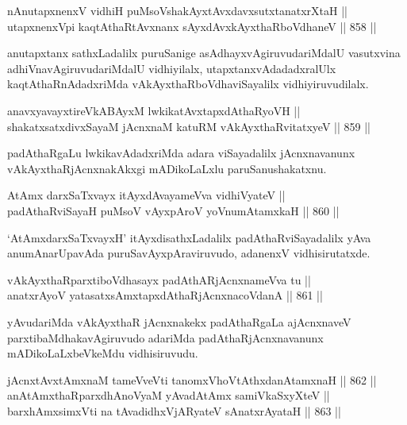\begin{shl}
nAnutapxnenxV vidhiH puMsoV\s shakAyxtAvxdavxsutxtanatxrXtaH || \\
utapxnenxV\s pi kaqtAthaRtAvxnanx sAyxdAvxkAyxthaRboVdhaneV \hfill || 858 ||  
\end{shl}

\begin{artha}
anutapxtanx sathxLadalilx puruSanige asAdhayxvAgiruvudariMdalU vasutxvina adhiVnavAgiruvudariMdalU vidhiyilalx, utapxtanxvAdadadxralUlx kaqtAthaRnAdadxriMda vAkAyxthaRboVdhaviSayalilx vidhiyiruvudilalx.
\end{artha}

\begin{shl}
anavxyavayxtireVkABAyxM lwkikatAvxtapxdAthaRyoVH || \\
shakatxsatxdivxSayaM jAcnxnaM katuRM vAkAyxthaRvitatxyeV \hfill || 859 ||  
\end{shl}

\begin{artha}
padAthaRgaLu lwkikavAdadxriMda adara viSayadalilx jAcnxnavanunx vAkAyxthaRjAcnxnakAkxgi mADikoLaLxlu paruSanushakatxnu.
\end{artha}

\begin{shl}
AtAmx darxSaTxvayx itAyxdAvayameVva vidhiVyateV || \\
padAthaRviSayaH puMsoV vAyxpAroV yoV\s numAtamxkaH \hfill || 860 ||  
\end{shl}

\begin{artha}
`AtAmxdarxSaTxvayxH' itAyxdisathxLadalilx padAthaRviSayadalilx yAva anumAnarUpavAda puruSavAyxpAraviruvudo, adanenxV vidhisirutatxde.
\end{artha}

\begin{shl}
vAkAyxthaRparxtiboVdhasayx padAthARjAcnxnameVva tu || \\
anatxrAyoV yatasatxsAmxtapxdAthaRjAcnxnacoVdanA \hfill || 861 ||  
\end{shl}

\begin{artha}
yAvudariMda vAkAyxthaR jAcnxnakekx padAthaRgaLa ajAcnxnaveV parxtibaMdhakavAgiruvudo adariMda padAthaRjAcnxnavanunx mADikoLaLxbeVkeMdu vidhisiruvudu.
\end{artha}


\begin{shl}
jAcnxtAvx\s \s tAmxnaM tameVveVti tanomxVhoVtAthxdanAtamxnaH \hfill || 862 ||  \\
anAtAmxthaRparxdhAnoV\s yaM yAvadAtAmx samiVkaSxyXteV || \\
barxhAmxsimxVti na tAvadidhxVjARyateV sAnatxrAyataH \hfill || 863 ||  
\end{shl}

